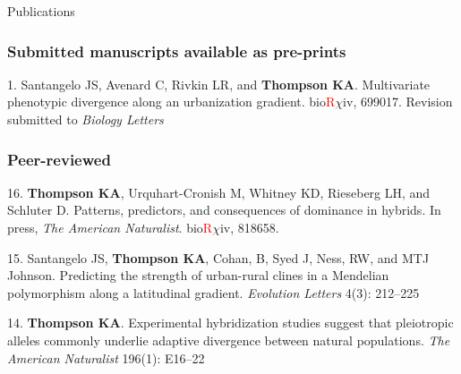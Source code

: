 \documentclass[11pt]{article}
\begin{document}
\noindent\begin{rSection}{Publications}



\subsubsection*{Submitted manuscripts available as pre-prints}

\noindent\hspace{.1cm}1. Santangelo JS, Avenard C, Rivkin LR, and \textbf{Thompson KA}. Multivariate phenotypic divergence along an urbanization gradient. bio\textcolor{red}{R}$\chi$iv, 699017. Revision submitted to \textit{Biology Letters}

\subsubsection*{Peer-reviewed}

\noindent\hspace{.1cm}16. \textbf{Thompson KA}, Urquhart-Cronish M, Whitney KD, Rieseberg LH, and Schluter D. Patterns, predictors, and consequences of dominance in hybrids. In press, \textit{The American Naturalist}. bio\textcolor{red}{R}$\chi$iv, 818658.


\noindent\hspace{.1cm}15. Santangelo JS, \textbf{Thompson KA}, Cohan, B, Syed J, Ness, RW, and MTJ Johnson. Predicting the strength of urban-rural clines in a Mendelian polymorphism along a latitudinal gradient. \textit{Evolution Letters} 4(3): 212--225 %

\noindent\hspace{.1cm}14. \textbf{Thompson KA}. Experimental hybridization studies suggest that pleiotropic alleles commonly underlie adaptive divergence between natural populations. \textit{The American Naturalist} 196(1): E16--22 %



\end{rSection}
\end{document}
